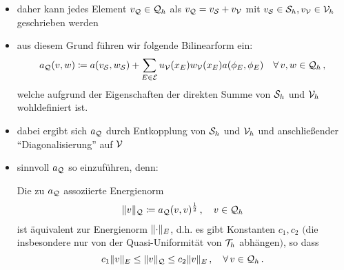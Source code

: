 \begin{itemize}
\begin{proof}
Auf dem Referenzelement $\tilde T$ ist $\{\phi_1,\phi_2,\phi_3\}$ eine Basis von $\mcal S_h$ mit
\[
	\phi_1(\xi,\eta) = 1-\xi-\eta \, , \quad \phi_2(\xi,\eta) = \xi \, , \quad \phi_3(\xi,\eta) = \eta
\]
und $\{\phi_4,\phi_5,\phi_6\}$ eine Basis von $\mcal V_h$ mit
\[
	\phi_1(\xi,\eta) = 4\xi (1-\xi-\eta) \, , \quad \phi_2(\xi,\eta) = 4\xi\eta \, , \quad \phi_3(\xi,\eta) = 4\eta(1-\xi-\eta) \, .
\]
Damit ist $\{\phi_1,\ldots,\phi_6\}$ ein Erzeugendensystem von $\mcal Q_h$, da jedes Element
\[
	a_0+a_1\xi+a_2\eta + a_3 \xi^2+ a_4\xi\eta +a_5\eta^2 \in \mcal Q_h
\]
als Linearkombination aus den Funktionen beschrieben werden kann ($\phi_1$ bis $\phi_6$ enthalten alle vorkommenden Summanden eines Polynom 2. Grades). Außerdem ist leicht nachzurechnen, dass die Funktionen $\phi_i,i = 1,\ldots,6,$ linear unabhängig sind und damit gilt
\[
	\mcal Q_h = \operatorname{span} \{\phi_1,\ldots,\phi_6\} \, .
\]
Aus der linearen Unabhängigkeit folgt damit auch $\mcal S_h \cap \mcal V_h = \{0\}$ gilt und damit die Behauptung.
\end{proof}

\item daher kann jedes Element $v_{\mathcal Q} \in \mathcal Q_h$  als $v_{\mathcal Q} = v_{\mathcal S} + v_{\mathcal V}$ mit $v_{\mathcal S} \in \mathcal S_h, v_{\mathcal V}\in \mathcal V_h$ geschrieben werden

\item aus diesem Grund führen wir folgende Bilinearform ein:
\begin{align*}
	a_{\mathcal Q} (v,w) \coloneqq a(v_{\mathcal S},w_{\mathcal S}) + \sum_{E \in \mathcal E} u_{\mathcal V}(x_E) w_{\mathcal V}(x_E) a(\phi_E,\phi_E) \quad \forall \, v,w \in \mathcal Q_h \, ,
\end{align*}
welche aufgrund der Eigenschaften der direkten Summe von $\mcal S_h$ und $\mcal V_h$ wohldefiniert ist.

\item dabei ergibt sich $a_{\mathcal Q}$ durch Entkopplung von $\mcal S_h$ und $\mcal V_h$ und anschließender "`Diagonalisierung"' auf $\mathcal V$

\item sinnvoll $a_{\mathcal Q}$ so einzuführen, denn:
\begin{satz}\label{satz:4.9}
Die zu $a_{\mathcal Q}$ assoziierte Energienorm
\begin{align*}
	\lVert v\rVert_{\mathcal Q}\coloneqq a_{\mathcal Q}(v,v)^{\frac 1 2} \, , \quad v \in \mathcal Q_h
\end{align*}
ist äquivalent zur Energienorm $\lVert \cdot\rVert_E$, d.h. es gibt Konstanten $c_1,c_2$ $($die insbesondere nur von der Quasi-Uniformität von $\mathcal T_h$ abhängen$)$, so dass
\[
	c_1 \lVert v\rVert_E \le \lVert v\rVert_{\mathcal Q} \le c_2 \lVert v\rVert_E \, , \quad \forall \, v \in \mathcal Q_h \, .
\]
\end{satz}


\end{itemize}
